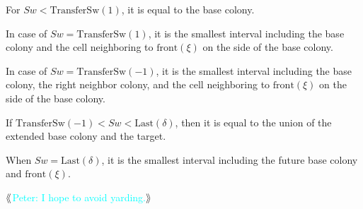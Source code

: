 \documentclass[12pt]{memoir}
\newcommand{\authnote}[3]
{{ \textcolor{#3}{$\langle\hspace{-0.2em}\langle$\textsf{\footnotesize #1: #2}$\rangle\hspace{-0.2em}\rangle$}}}
\newcommand{\authnote}[2]{}
\newcommand{\Pnote}[1]{{\authnote{Peter}{#1}{cyan}}}
\newcommand{\fld}[1]{\ensuremath{\textit{#1}}}
\def\B{B}
\newcommand{\cKind}{\fld{cKind}}
\newcommand{\Sweep}{\fld{Sw}}
\newcommand{\front}{\mathrm{front}}
\newcommand{\Last}{\mathrm{Last}}
\newcommand{\Member}{\mathrm{Member}}
\newcommand{\TransferSw}{\mathrm{TransferSw}}
\begin{document}
\begin{definition}
\begin{flushdescription}
        \begin{bullets}
            \item For \( \Sweep < \TransferSw(1) \),
                  it is equal to the base colony.
            \item In case of \( \Sweep = \TransferSw(1) \),
                  it is the smallest interval including
                  the base colony and the cell neighboring to
                  \( \front(\xi) \) on the side of the base colony.

            \item In case of \( \Sweep = \TransferSw(-1) \),
                  it is the smallest interval including
                  the base colony, the right neighbor colony,
                  and the cell neighboring to
                  \( \front(\xi) \) on the side of the base colony.

            \item If \( \TransferSw(-1) < \Sweep < \Last(\delta) \),
                  then it is equal to the union of the extended base colony and the target.
            \item When \( \Sweep = \Last(\delta) \), it is
                  the smallest interval including the future
                  base colony and \( \front(\xi) \).
        \end{bullets}


\Pnote{I hope to avoid yarding.}





\end{flushdescription}
\end{definition}
\end{document}
